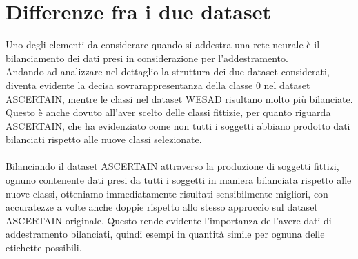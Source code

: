 \section{Differenze fra i due dataset}
Uno degli elementi da considerare quando si addestra una rete neurale è il bilanciamento dei dati presi in considerazione per l'addestramento.\\
Andando ad analizzare nel dettaglio la struttura dei due dataset considerati, diventa evidente la decisa sovrarappresentanza della classe 0 nel dataset ASCERTAIN, mentre le classi nel dataset WESAD risultano molto più bilanciate. Questo è anche dovuto all'aver scelto delle classi fittizie, per quanto riguarda ASCERTAIN, che ha evidenziato come non tutti i soggetti abbiano prodotto dati bilanciati rispetto alle nuove classi selezionate.\\\\
Bilanciando il dataset ASCERTAIN attraverso la produzione di soggetti fittizi, ognuno contenente dati presi da tutti i soggetti in maniera bilanciata rispetto alle nuove classi, otteniamo immediatamente risultati sensibilmente migliori, con accuratezze a volte anche doppie rispetto allo stesso approccio sul dataset ASCERTAIN originale. Questo rende evidente l'importanza dell'avere dati di addestramento bilanciati, quindi esempi in quantità simile per ognuna delle etichette possibili.
